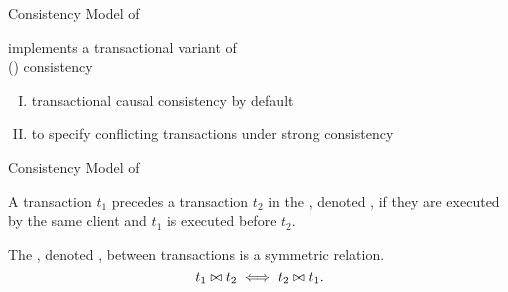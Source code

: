 \begin{frame}{Consistency Model of \unistore}
  \begin{center}
    \unistore{} implements a transactional variant of \\
     (\por) consistency \\[3pt]

    \vspace{0.60cm}
    \begin{enumerate}[(I)]
      \centering
      \item transactional causal consistency by default
      \item to specify conflicting transactions under strong consistency
    \end{enumerate}
  \end{center}
\end{frame}

\begin{frame}{Consistency Model of \unistore}
  \begin{definition}
    A transaction $t_{1}$ precedes a transaction $t_{2}$
    in the , denoted ,
    if they are executed by the same client and $t_{1}$ is executed before $t_{2}$.
  \end{definition}

  \vspace{0.60cm}
  \begin{definition}
    The , denoted \red{$\conflict$},
    between transactions is a symmetric relation.
    \[
      t_{1} \bowtie t_{2} \iff t_{2} \bowtie t_{1}.
    \]
  \end{definition}
\end{frame}

